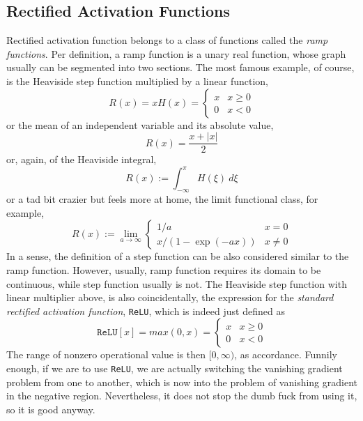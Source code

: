 \subsection{Rectified Activation Functions}
Rectified activation function belongs to a class of functions called the \textit{ramp functions}. Per definition, a ramp function is a unary real function, whose graph usually can be segmented into two sections. The most famous example, of course, is the Heaviside step function multiplied by a linear function, 
\begin{equation}
    R(x) = xH(x) = \begin{cases}
        x & x \geq 0 \\
        0 & x < 0
    \end{cases}
\end{equation}
or the mean of an independent variable and its absolute value, 
\begin{equation}
    R(x) = \frac{x+|x|}{2}
\end{equation}
or, again, of the Heaviside integral, 
\begin{equation}
    R(x):= \int^{\pi}_{-\infty}H(\xi)\:d\xi
\end{equation}
or a tad bit crazier but feels more at home, the limit functional class, for example, 
\begin{equation}
    R(x) := \lim_{a\to\infty} \begin{cases}
        1/a & x = 0 \\
        x/(1-\exp{(-ax)}) & x \neq 0 
    \end{cases}
\end{equation}
In a sense, the definition of a step function can be also considered similar to the ramp function. However, usually, ramp function requires its domain to be continuous, while step function usually is not. The Heaviside step function with linear multiplier above, is also coincidentally, the expression for the \textit{standard rectified activation function}, \texttt{ReLU}, which is indeed just defined as
\begin{equation}
    \texttt{ReLU}[x] = max(0,x) = \begin{cases}
        x & x \geq 0 \\
        0 & x < 0
    \end{cases}
\end{equation}
The range of nonzero operational value is then $[0,\infty)$, as accordance. Funnily enough, if we are to use \texttt{ReLU}, we are actually switching the vanishing gradient problem from one to another, which is now into the problem of vanishing gradient in the negative region. Nevertheless, it does not stop the dumb fuck from using it, so it is good anyway. 

